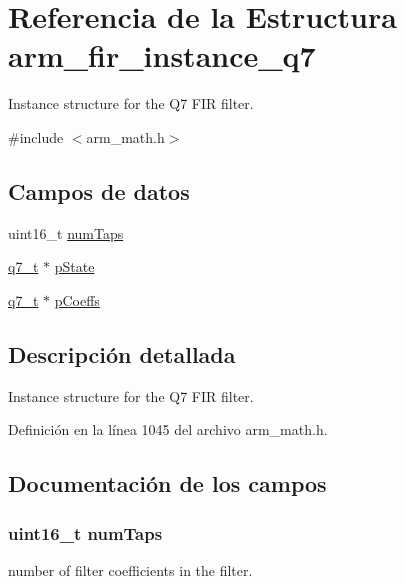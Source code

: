 \hypertarget{structarm__fir__instance__q7}{}\section{Referencia de la Estructura arm\+\_\+fir\+\_\+instance\+\_\+q7}
\label{structarm__fir__instance__q7}


Instance structure for the Q7 F\+IR filter.  




{\ttfamily \#include $<$arm\+\_\+math.\+h$>$}

\subsection*{Campos de datos}
\begin{DoxyCompactItemize}
\item 
uint16\+\_\+t \hyperlink{structarm__fir__instance__q7_a751941891e47f522a7f5375fe8990aac}{num\+Taps}
\item 
\hyperlink{arm__math_8h_ae541b6f232c305361e9b416fc9eed263}{q7\+\_\+t} $\ast$ \hyperlink{structarm__fir__instance__q7_aa8f67102521b620af6f259afdcf29785}{p\+State}
\item 
\hyperlink{arm__math_8h_ae541b6f232c305361e9b416fc9eed263}{q7\+\_\+t} $\ast$ \hyperlink{structarm__fir__instance__q7_a54407554b4fe7bbbb43924e4eea45e7f}{p\+Coeffs}
\end{DoxyCompactItemize}


\subsection{Descripción detallada}
Instance structure for the Q7 F\+IR filter. 

Definición en la línea 1045 del archivo arm\+\_\+math.\+h.



\subsection{Documentación de los campos}
\subsubsection[{\texorpdfstring{num\+Taps}{numTaps}}]{\setlength{\rightskip}{0pt plus 5cm}uint16\+\_\+t num\+Taps}\hypertarget{structarm__fir__instance__q7_a751941891e47f522a7f5375fe8990aac}{}\label{structarm__fir__instance__q7_a751941891e47f522a7f5375fe8990aac}
number of filter coefficients in the filter. 

